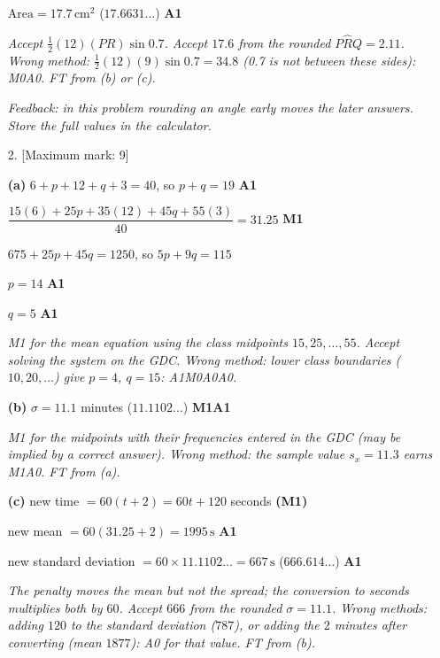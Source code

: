 \documentclass[12pt, twoside]{article}
\begin{document}
\begin{enumerate}[itemsep=0.3cm]
$\text{Area} = 17.7\,\text{cm}^{2}$ \quad ($17.6631\ldots$) \hfill \textbf{A1}

\emph{Accept $\frac{1}{2}(12)(PR)\sin 0.7$. Accept $17.6$ from the rounded
$P\hat{R}Q = 2.11$. Wrong method: $\frac{1}{2}(12)(9)\sin 0.7 = 34.8$ (0.7
is not between these sides): M0A0. FT from (b) or (c).}

\emph{Feedback: in this problem rounding an angle early moves the later
answers. Store the full values in the calculator.}

\newpage

\item[2.] [Maximum mark: 9]

\textbf{(a)} $6 + p + 12 + q + 3 = 40$, so $p + q = 19$ \hfill \textbf{A1}

$\dfrac{15(6) + 25p + 35(12) + 45q + 55(3)}{40} = 31.25$ \hfill \textbf{M1}

$675 + 25p + 45q = 1250$, so $5p + 9q = 115$

$p = 14$ \hfill \textbf{A1}

$q = 5$ \hfill \textbf{A1}

\emph{M1 for the mean equation using the class midpoints $15, 25, \ldots,
55$. Accept solving the system on the GDC. Wrong method: lower class
boundaries ($10, 20, \ldots$) give $p = 4$, $q = 15$: A1M0A0A0.}

\textbf{(b)} $\sigma = 11.1$ minutes \quad ($11.1102\ldots$) \hfill \textbf{M1A1}

\emph{M1 for the midpoints with their frequencies entered in the GDC (may
be implied by a correct answer). Wrong method: the sample value
$s_{x} = 11.3$ earns M1A0. FT from (a).}

\textbf{(c)} new time $= 60(t + 2) = 60t + 120$ seconds \hfill \textbf{(M1)}

new mean $= 60(31.25 + 2) = 1995\,\text{s}$ \hfill \textbf{A1}

new standard deviation $= 60 \times 11.1102\ldots = 667\,\text{s}$ \quad ($666.614\ldots$) \hfill \textbf{A1}

\emph{The penalty moves the mean but not the spread; the conversion to
seconds multiplies both by $60$. Accept $666$ from the rounded $\sigma =
11.1$. Wrong methods: adding $120$ to the standard deviation ($787$), or
adding the $2$ minutes after converting (mean $1877$): A0 for that value.
FT from (b).}

\end{enumerate}
\end{document}
